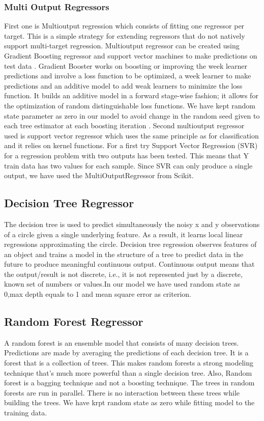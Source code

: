 \subsubsection{Multi Output Regressors}
First one is Multioutput regression which consists of fitting one regressor per target. This is a simple strategy for extending regressors that do not natively support multi-target regression. Multioutput regressor can be created using Gradient Boosting regressor and support vector machines to make predictions on test data \cite{scikit-learn}.\newline
Gradient Booster works on boosting or improving the week learner predictions and involve a loss function to be optimized, a week learner to make predictions and an additive model to add weak learners to minimize the loss function. It builds an additive model in a forward stage-wise fashion; it allows for the optimization of random distinguishable loss functions. We have kept random state parameter as zero in our model to avoid change in  the random seed given to each tree estimator at each boosting iteration \cite{scikit-learn:GradientBoostingRegressor}.\newline 
Second multioutput regressor used is support vector regressor which uses the same principle as for classification and it relies on kernel functions. For a first try Support Vector Regression (SVR) for a regression problem with two outputs has been tested. This means that Y train data has two values for each sample. Since SVR can only produce a single output, we have used the MultiOutputRegressor from Scikit.
\subsection{Decision Tree Regressor}
The decision tree is used to predict simultaneously the noisy x and y observations of a circle given a single underlying feature. As a result, it learns local linear regressions approximating the circle. Decision tree regression observes features of an object and trains a model in the structure of a tree to predict data in the future to produce meaningful continuous output. Continuous output means that the output/result is not discrete, i.e., it is not represented just by a discrete, known set of numbers or values.In our model we have used random state as 0,max depth equals to 1 and mean square error as criterion.\newline
\subsection{Random Forest Regressor}
A random forest is an ensemble model that consists of many decision trees. Predictions are made by averaging the predictions of each decision tree. It is a forest that is a collection of trees. This makes random forests a strong modeling technique that’s much more powerful than a single decision tree. Also, Random forest is a bagging technique and not a boosting technique. The trees in random forests are run in parallel. There is no interaction between these trees while building the trees. We have krpt random state as zero while fitting model to the training data.\newline

